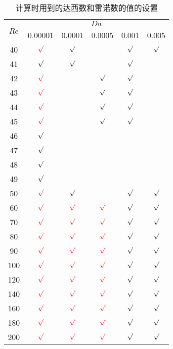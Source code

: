 \begin{table}
	\caption{计算时用到的达西数和雷诺数的值的设置}\label{tab: DaRe}
	\vspace{.5em}\centering\wuhao
	\begin{tabular}{*{6}{c}}
		\toprule[1.5pt]
		\multirow{2}[3]{*}{$Re$} & \multicolumn{5}{c}{$Da$} \\
		\cmidrule[.67pt](lr){2-6}
		& 0.00001 & 0.0001 & 0.0005 & 0.001 & 0.005 \\
		\midrule[1pt]
		40 & ${\color{red}\surd}$ & $\surd$ &   & $\surd$ & $\surd$ \\
		41 & $\surd$ & $\surd$ &   & $\surd$ &   \\
		42 & ${\color{red}\surd}$ &   & $\surd$ & $\surd$ &   \\
		43 & ${\color{red}\surd}$ &   & $\surd$ & $\surd$ &   \\
		44 & ${\color{red}\surd}$ &   & $\surd$ & $\surd$ &   \\
		45 & ${\color{red}\surd}$ &   & $\surd$ & $\surd$ &   \\
		46 & $\surd$ &         &   &         &   \\
		47 & $\surd$ &         &   &         &   \\
		48 & $\surd$ &         &   &         &   \\
		49 & $\surd$ &         &   &         &   \\
		50 & ${\color{red}\surd}$ & $\surd$ &   & $\surd$ & $\surd$ \\
		60 & ${\color{red}\surd}$ & ${\color{red}\surd}$ & ${\color{red}\surd}$ & $\surd$ & $\surd$ \\
		70 & ${\color{red}\surd}$ & ${\color{red}\surd}$ & ${\color{red}\surd}$ & $\surd$ & $\surd$ \\
		80 & ${\color{red}\surd}$ & ${\color{red}\surd}$ & ${\color{red}\surd}$ & $\surd$ & $\surd$ \\
		90 & ${\color{red}\surd}$ & ${\color{red}\surd}$ & ${\color{red}\surd}$ & $\surd$ & $\surd$ \\
		100 & ${\color{red}\surd}$ & ${\color{red}\surd}$ & ${\color{red}\surd}$ & $\surd$ & $\surd$ \\
		120 & ${\color{red}\surd}$ & ${\color{red}\surd}$ & ${\color{red}\surd}$ & $\surd$ & $\surd$ \\
		140 & ${\color{red}\surd}$ & ${\color{red}\surd}$ & ${\color{red}\surd}$ & $\surd$ & $\surd$ \\
		160 & ${\color{red}\surd}$ & ${\color{red}\surd}$ & ${\color{red}\surd}$ & $\surd$ & $\surd$ \\
		180 & ${\color{red}\surd}$ & ${\color{red}\surd}$ & ${\color{red}\surd}$ & $\surd$ & $\surd$ \\
		200 & ${\color{red}\surd}$ & ${\color{red}\surd}$ & ${\color{red}\surd}$ & $\surd$ & $\surd$ \\
		\bottomrule[1.5pt]
	\end{tabular}
\end{table}

